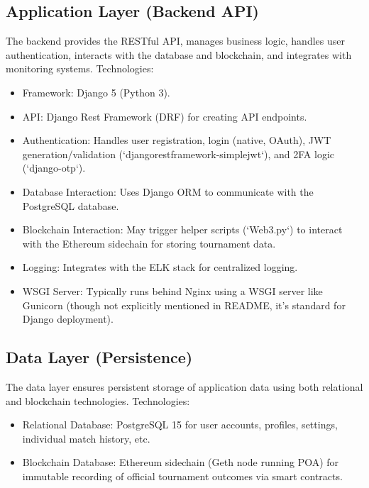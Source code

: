 \subsection*{Application Layer (Backend API)}
The backend provides the RESTful API, manages business logic, handles user authentication, interacts with the database and blockchain, and integrates with monitoring systems. Technologies:
\begin{itemize}
    \item Framework: Django 5 (Python 3).
    \item API: Django Rest Framework (DRF) for creating API endpoints.
    \item Authentication: Handles user registration, login (native, OAuth), JWT generation/validation (`djangorestframework-simplejwt`), and 2FA logic (`django-otp`).
    \item Database Interaction: Uses Django ORM to communicate with the PostgreSQL database.
    \item Blockchain Interaction: May trigger helper scripts (`Web3.py`) to interact with the Ethereum sidechain for storing tournament data.
    \item Logging: Integrates with the ELK stack for centralized logging.
    \item WSGI Server: Typically runs behind Nginx using a WSGI server like Gunicorn (though not explicitly mentioned in README, it's standard for Django deployment).
\end{itemize}

\subsection*{Data Layer (Persistence)}
The data layer ensures persistent storage of application data using both relational and blockchain technologies. Technologies:
\begin{itemize}
    \item Relational Database: PostgreSQL 15 for user accounts, profiles, settings, individual match history, etc.
    \item Blockchain Database: Ethereum sidechain (Geth node running POA) for immutable recording of official tournament outcomes via smart contracts.
\end{itemize}

